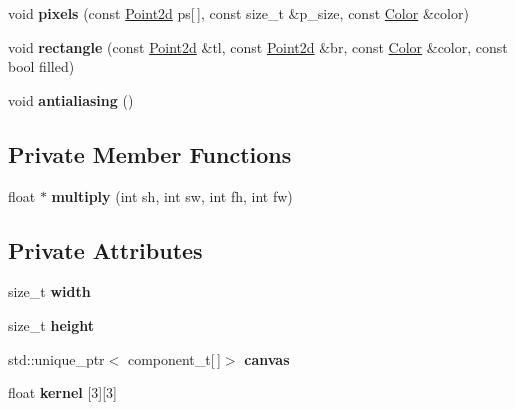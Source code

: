 \begin{DoxyCompactItemize}
\item 
\mbox{\label{classtiara_1_1Canvas_ad85ca8a8a86d8c09bc8eef17c2ff33c0}} 
void {\bfseries pixels} (const \mbox{\hyperlink{classtiara_1_1Point2d}{Point2d}} ps\mbox{[}$\,$\mbox{]}, const size\+\_\+t \&p\+\_\+size, const \mbox{\hyperlink{classtiara_1_1Color}{Color}} \&color)
\item 
\mbox{\label{classtiara_1_1Canvas_aa21f2b01132844ae05bbbbce07fa5e35}} 
void {\bfseries rectangle} (const \mbox{\hyperlink{classtiara_1_1Point2d}{Point2d}} \&tl, const \mbox{\hyperlink{classtiara_1_1Point2d}{Point2d}} \&br, const \mbox{\hyperlink{classtiara_1_1Color}{Color}} \&color, const bool filled)
\item 
\mbox{\label{classtiara_1_1Canvas_a34a8de1d0fd6ac2f73f95390b140a418}} 
void {\bfseries antialiasing} ()
\end{DoxyCompactItemize}
\subsection*{Private Member Functions}
\begin{DoxyCompactItemize}
\item 
\mbox{\label{classtiara_1_1Canvas_a26fa95632f0555c332c97dd0dd4e95fd}} 
float $\ast$ {\bfseries multiply} (int sh, int sw, int fh, int fw)
\end{DoxyCompactItemize}
\subsection*{Private Attributes}
\begin{DoxyCompactItemize}
\item 
\mbox{\label{classtiara_1_1Canvas_a1fa17baf31795af10aabda7213ad46f1}} 
size\+\_\+t {\bfseries width}
\item 
\mbox{\label{classtiara_1_1Canvas_a2a550fb1e9c5b44bac1c0110b9a54416}} 
size\+\_\+t {\bfseries height}
\item 
\mbox{\label{classtiara_1_1Canvas_a30cbd06cc4f489721f3bc9004367ee33}} 
std\+::unique\+\_\+ptr$<$ component\+\_\+t\mbox{[}$\,$\mbox{]}$>$ {\bfseries canvas}
\item 
float {\bfseries kernel} \mbox{[}3\mbox{]}\mbox{[}3\mbox{]}
\end{DoxyCompactItemize}



